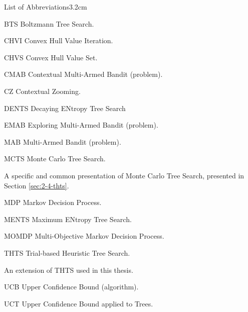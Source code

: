 \begin{mclistof}{List of Abbreviations}{3.2cm}
    \item[BTS] Boltzmann Tree Search.
    \item[CHVI] Convex Hull Value Iteration.
    \item[CHVS] Convex Hull Value Set.
    \item[CMAB] Contextual Multi-Armed Bandit (problem).
    \item[CZ] Contextual Zooming. 
    \item[DENTS] Decaying ENtropy Tree Search
    \item[EMAB] Exploring Multi-Armed Bandit (problem).
    \item[MAB] Multi-Armed Bandit (problem). 
    \item[MCTS] Monte Carlo Tree Search.
    \item[\mctsone] A specific and common presentation of Monte Carlo Tree Search, presented in Section \ref{sec:2-4-thts}.
    \item[MDP] Markov Decision Process.
    \item[MENTS] Maximum ENtropy Tree Search.
    \item[MOMDP] Multi-Objective Markov Decision Process.
    \item[THTS] Trial-based Heuristic Tree Search.
    \item[\thtspp] An extension of THTS used in this thesis.
    \item[UCB] Upper Confidence Bound (algorithm).
    \item[UCT] Upper Confidence Bound applied to Trees.
\end{mclistof} 


